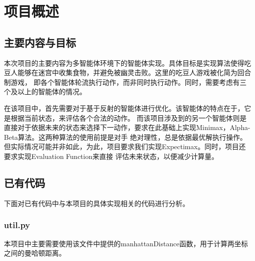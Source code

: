 \chapter{项目概述}
\section{主要内容与目标}
本次项目的主要内容为多智能体环境下的智能体实现。具体目标是实现算法使得吃豆人能够在迷宫中收集食物，并避免被幽灵击败。这里的吃豆人游戏被化简为回合制游戏，
即各个智能体轮流执行动作，而非同时执行动作。同时，需要考虑有三个及以上的智能体的情况。

在该项目中，首先需要对于基于反射的智能体进行优化。该智能体的特点在于，它是根据当前状态，来评估各个合法的动作。
而该项目涉及到的另一个智能体则是直接对于依据未来的状态来选择下一动作，要求在此基础上实现Minimax，Alpha-Beta算法。这两种算法的使用前提是对手
绝对理性，总是依据最优解执行操作。但实际情况可能并非如此，为此，项目要求我们实现Expectimax。同时，项目还要求实现Evaluation Function来直接
评估未来状态，以便减少计算量。

\section{已有代码}
下面对已有代码中与本项目的具体实现相关的代码进行分析。
\subsection{util.py}
本项目中主要需要使用该文件中提供的manhattanDistance函数，用于计算两坐标之间的曼哈顿距离。

